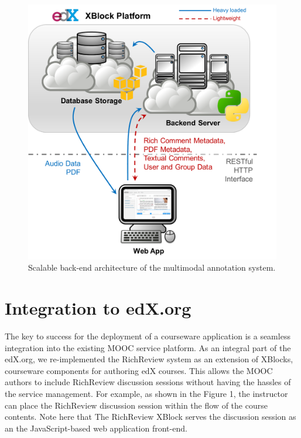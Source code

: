 \documentclass{sigchi}
\begin{document}
\begin{figure}[!h]
\centering
\includegraphics[width=0.95\columnwidth]{figure_architecture}
\caption{Scalable back-end architecture of the multimodal annotation system.}
\label{fig:figure2}
\end{figure}

\section{Integration to edX.org} 

The key to success for the deployment of a courseware application is a seamless integration into the existing MOOC service platform.
As an integral part of the edX.org, we re-implemented the RichReview system as an extension of XBlocks, courseware components for authoring edX courses.
This allows the MOOC authors to include RichReview discussion sessions without having the hassles of the service management.
For example, as shown in the Figure 1, the instructor can place the RichReview discussion session within the flow of the course contents.
Note here that The RichReview XBlock serves the discussion session as an the JavaScript-based web application front-end.
\end{document}
